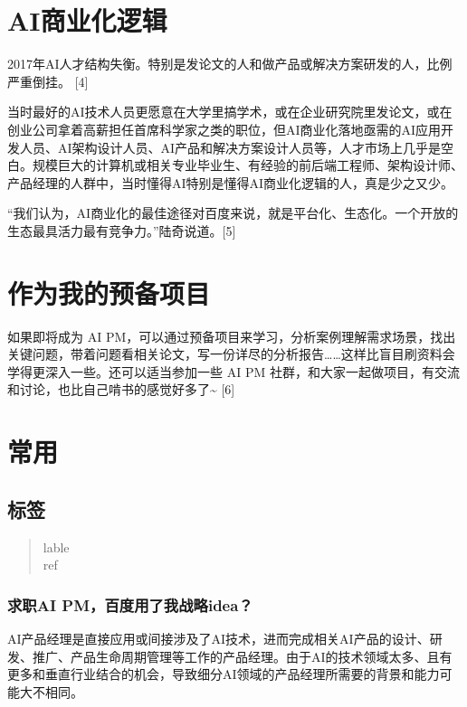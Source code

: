 \documentclass[letterpaper,11pt,english]{sphinxmanual}
\begin{document}
\chapter{AI商业化逻辑}
\label{\detokenize{index:id4}}
2017年AI人才结构失衡。特别是发论文的人和做产品或解决方案研发的人，比例严重倒挂。
{[}4{]}

当时最好的AI技术人员更愿意在大学里搞学术，或在企业研究院里发论文，或在创业公司拿着高薪担任首席科学家之类的职位，但AI商业化落地亟需的AI应用开发人员、AI架构设计人员、AI产品和解决方案设计人员等，人才市场上几乎是空白。规模巨大的计算机或相关专业毕业生、有经验的前后端工程师、架构设计师、产品经理的人群中，当时懂得AI特别是懂得AI商业化逻辑的人，真是少之又少。

“我们认为，AI商业化的最佳途径对百度来说，就是平台化、生态化。一个开放的生态最具活力最有竞争力。”陆奇说道。{[}5{]}


\chapter{作为我的预备项目}
\label{\detokenize{index:id5}}
如果即将成为 AI
PM，可以通过预备项目来学习，分析案例理解需求场景，找出关键问题，带着问题看相关论文，写一份详尽的分析报告……这样比盲目刷资料会学得更深入一些。还可以适当参加一些
AI PM 社群，和大家一起做项目，有交流和讨论，也比自己啃书的感觉好多了\textasciitilde{}
{[}6{]}


\chapter{常用}
\label{\detokenize{index:id6}}

\section{标签}
\label{\detokenize{index:id7}}\begin{quote}\begin{description}
\item[{lable}] \leavevmode
\item[{ref}] \leavevmode
\end{description}\end{quote}


\subsection{求职AI PM，百度用了我战略idea？}
\label{\detokenize{get_started:ai-pm-idea}}\label{\detokenize{get_started::doc}}
AI产品经理是直接应用或间接涉及了AI技术，进而完成相关AI产品的设计、研发、推广、产品生命周期管理等工作的产品经理。由于AI的技术领域太多、且有更多和垂直行业结合的机会，导致细分AI领域的产品经理所需要的背景和能力可能大不相同。%
\begin{footnote}[1]\sphinxAtStartFootnote
{}
%
\end{footnote}
\end{document}
